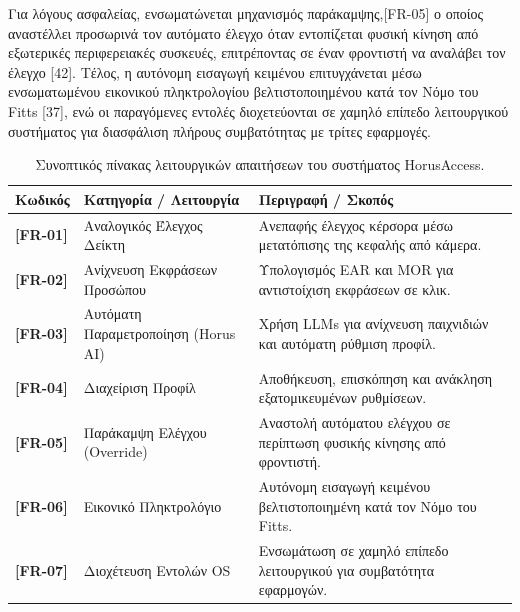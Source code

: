 \documentclass[twoside, a4paper, 11pt]{article}
\newcommand{\textlatin}[1]{\textenglish{#1}}
\begin{document}
Για λόγους ασφαλείας, ενσωματώνεται μηχανισμός παράκαμψης,[FR-05] ο οποίος αναστέλλει προσωρινά τον αυτόματο έλεγχο όταν εντοπίζεται φυσική κίνηση από εξωτερικές περιφερειακές συσκευές, επιτρέποντας σε έναν φροντιστή να αναλάβει τον έλεγχο [42].
Τέλος, η αυτόνομη εισαγωγή κειμένου επιτυγχάνεται μέσω ενσωματωμένου εικονικού πληκτρολογίου βελτιστοποιημένου κατά τον Νόμο του \textlatin{Fitts} [37], ενώ οι παραγόμενες εντολές διοχετεύονται σε χαμηλό επίπεδο λειτουργικού συστήματος 
για διασφάλιση πλήρους συμβατότητας με τρίτες εφαρμογές.
\begin{table}[!htbp]
\centering
\begin{tabular}{|l|p{4cm}|p{6.5cm}|}
\hline
\textbf{Κωδικός} & \textbf{Κατηγορία / Λειτουργία} & \textbf{Περιγραφή / Σκοπός} \\ \hline
\textbf{[FR-01]} & Αναλογικός Έλεγχος Δείκτη & Ανεπαφής έλεγχος κέρσορα μέσω μετατόπισης της κεφαλής από κάμερα. \\ \hline
\textbf{[FR-02]} & Ανίχνευση Εκφράσεων Προσώπου & Υπολογισμός \textlatin{EAR} και \textlatin{MOR} για αντιστοίχιση εκφράσεων σε κλικ. \\ \hline
\textbf{[FR-03]} & Αυτόματη Παραμετροποίηση (\textlatin{Horus AI}) & Χρήση \textlatin{LLMs} για ανίχνευση παιχνιδιών και αυτόματη ρύθμιση προφίλ. \\ \hline
\textbf{[FR-04]} & Διαχείριση Προφίλ & Αποθήκευση, επισκόπηση και ανάκληση εξατομικευμένων ρυθμίσεων. \\ \hline
\textbf{[FR-05]} & Παράκαμψη Ελέγχου (\textlatin{Override}) & Αναστολή αυτόματου ελέγχου σε περίπτωση φυσικής κίνησης από φροντιστή. \\ \hline
\textbf{[FR-06]} & Εικονικό Πληκτρολόγιο & Αυτόνομη εισαγωγή κειμένου βελτιστοποιημένη κατά τον Νόμο του \textlatin{Fitts}. \\ \hline
\textbf{[FR-07]} & Διοχέτευση Εντολών \textlatin{OS} & Ενσωμάτωση σε χαμηλό επίπεδο λειτουργικού για συμβατότητα εφαρμογών. \\ \hline
\end{tabular}
\caption{Συνοπτικός πίνακας λειτουργικών απαιτήσεων του συστήματος \textlatin{HorusAccess}.}
\label{tab:fr_summary}
\end{table}

\clearpage
\end{document}

